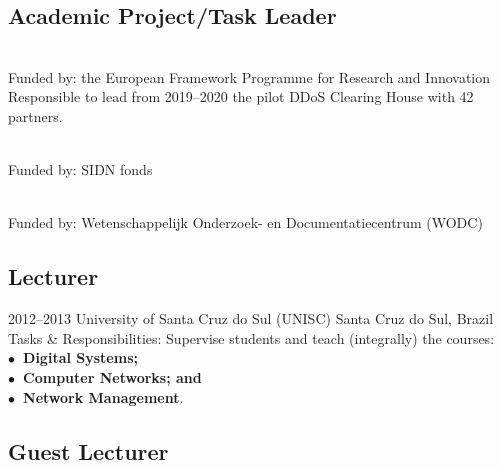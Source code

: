 \documentclass[print]{styles/friggeri-cv-mac} %
\begin{document}
\subsection{Academic Project/Task Leader}\vspace{-5pt}
\begin{entrylist}
	
{\\Funded by: the European Framework Programme for Research and Innovation}
{Responsible to lead from 2019--2020 the pilot DDoS Clearing House with 42 partners.}%

{\\Funded by: SIDN fonds}%
{}

{\\Funded by: Wetenschappelijk Onderzoek- en Documentatiecentrum (WODC)}%
{}
\end{entrylist}


\subsection{Lecturer}\vspace{-5pt}
\begin{entrylist}
\entry
{2012--2013}
{University of Santa Cruz do Sul (UNISC)}
{Santa Cruz do Sul, Brazil}
{Tasks \& Responsibilities: Supervise students and teach (integrally) the courses: \\
	\textbf{$\bullet$~Digital Systems;\\$\bullet$~Computer Networks; and\\$\bullet$~Network Management}.} 
\end{entrylist}

\newpage
\subsection{Guest Lecturer}\vspace{-5pt}
\end{document}
